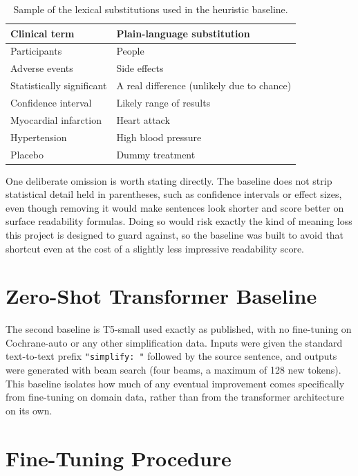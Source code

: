 \begin{table}[htbp]
    \centering
    \caption{Sample of the lexical substitutions used in the heuristic baseline.}
    \label{tab:lexicon-sample}
    \begin{tabular}{@{}ll@{}}
        \toprule
        \textbf{Clinical term} & \textbf{Plain-language substitution} \\
        \midrule
        Participants & People \\
        Adverse events & Side effects \\
        Statistically significant & A real difference (unlikely due to chance) \\
        Confidence interval & Likely range of results \\
        Myocardial infarction & Heart attack \\
        Hypertension & High blood pressure \\
        Placebo & Dummy treatment \\
        \bottomrule
    \end{tabular}
\end{table}

One deliberate omission is worth stating directly. The baseline does not strip statistical detail held in parentheses, such as confidence intervals or effect sizes, even though removing it would make sentences look shorter and score better on surface readability formulas. Doing so would risk exactly the kind of meaning loss this project is designed to guard against, so the baseline was built to avoid that shortcut even at the cost of a slightly less impressive readability score.

\section{Zero-Shot Transformer Baseline}
\label{sec:zeroshot-baseline}

The second baseline is T5-small used exactly as published, with no fine-tuning on Cochrane-auto or any other simplification data. Inputs were given the standard text-to-text prefix \texttt{"simplify: "} followed by the source sentence, and outputs were generated with beam search (four beams, a maximum of 128 new tokens). This baseline isolates how much of any eventual improvement comes specifically from fine-tuning on domain data, rather than from the transformer architecture on its own.

\section{Fine-Tuning Procedure}
\label{sec:finetuning-procedure}

